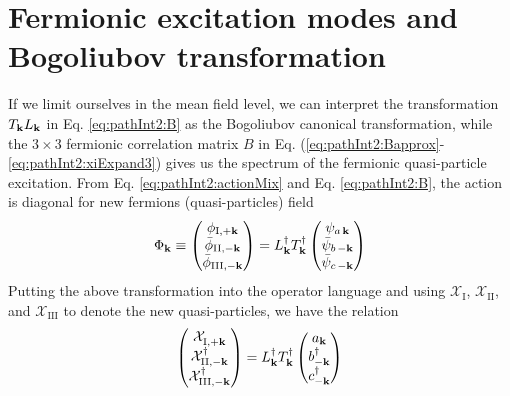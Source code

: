 \section{Fermionic excitation modes and Bogoliubov transformation\label{sec:pathInt2:bog}}
If we limit ourselves in the mean field level, we can interpret the transformation $T_{\mathbf{k}}{}L_{\mathbf{k}}$ in Eq. \eqref{eq:pathInt2:B} as the Bogoliubov canonical transformation, while  the $3\times3$ fermionic correlation matrix $B$ in Eq. (\ref{eq:pathInt2:Bapprox}-\ref{eq:pathInt2:xiExpand3}) gives us the spectrum of the  fermionic quasi-particle excitation. From Eq. \eqref{eq:pathInt2:actionMix} and Eq. \eqref{eq:pathInt2:B}, the action is diagonal for new fermions (quasi-particles) field 
\begin{equation*}
\Phi_\vk\equiv\mtrx{\phi_{\text{\Rmnum{1}},+\vk}\\\bar\phi_{\text{\Rmnum{2}},-\vk}\\\bar\phi_{\text{\Rmnum{3}},-\vk}}
=L^{\dg}_{\vk}T^{\dg}_{\vk}\mtrx{\psi_{a\,\vk}\\\bar\psi_{b\,-\vk}\\\bar\psi_{c\,-\vk}}
\end{equation*}
Putting the above transformation into the operator language and using $\mathcal{X}_{\text{I}}$, $\mathcal{X}_{\text{II}}$, and $\mathcal{X}_{\text{III}}$ to denote the new quasi-particles,  we have the relation 
\begin{equation}
\mtrx{\mathcal{X}^{}_{\text{\Rmnum{1}},+\vk}\\\mathcal{X}_{\text{II},-\vk}^{\dg}\\\mathcal{X}_{\text{III},-\vk}^{\dg}}
=L^{\dg}_{\vk}T^{\dg}_{\vk}  \mtrx{a_{\vk}\\b_{-\vk}^{\dg}\\c_{-\vk}^{\dg}}
\end{equation}   

